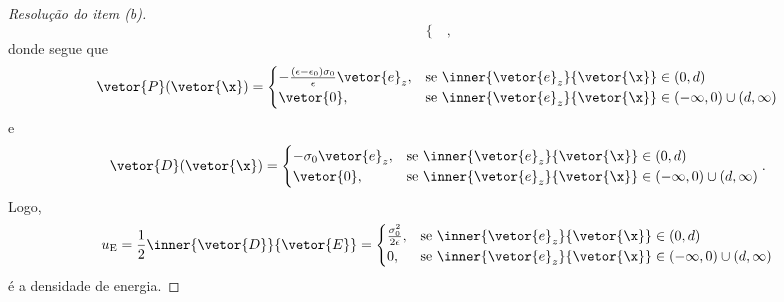 \begin{proof}[Resolução do item (b)]
\begin{equation*}
\begin{cases}
        \end{cases},
    \end{equation*}
    donde segue que
    \begin{equation*}
        \vetor{P}(\vetor{\x}) = \begin{cases}
            - \frac{(\epsilon - \epsilon_0)\sigma_0}{\epsilon}\vetor{e}_z,&\text{se }\inner{\vetor{e}_z}{\vetor{\x}} \in (0,d)\\
            \vetor{0}, &\text{se }\inner{\vetor{e}_z}{\vetor{\x}} \in (-\infty, 0) \cup (d, \infty)
        \end{cases}
    \end{equation*}
    e
    \begin{equation*}
        \vetor{D}(\vetor{\x}) = \begin{cases}
            - \sigma_0\vetor{e}_z,&\text{se }\inner{\vetor{e}_z}{\vetor{\x}} \in (0,d)\\
            \vetor{0}, &\text{se }\inner{\vetor{e}_z}{\vetor{\x}} \in (-\infty, 0) \cup (d, \infty)
        \end{cases}.
    \end{equation*}
    Logo,
    \begin{equation*}
        u_\mathrm{E} = \frac12 \inner{\vetor{D}}{\vetor{E}} = \begin{cases}
            \frac{\sigma_0^2}{2\epsilon},&\text{se }\inner{\vetor{e}_z}{\vetor{\x}} \in (0,d)\\
            0, &\text{se }\inner{\vetor{e}_z}{\vetor{\x}} \in (-\infty,0)\cup (d, \infty)
        \end{cases}
    \end{equation*}
    é a densidade de energia.
\end{proof}

